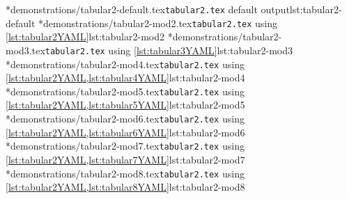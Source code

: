 	\begin{widepage}
		\cmhlistingsfromfile[showspaces=false,showtabs=false]*{demonstrations/tabular2-default.tex}{\texttt{tabular2.tex} default output}{lst:tabular2-default}
		\cmhlistingsfromfile[showspaces=false,showtabs=false]*{demonstrations/tabular2-mod2.tex}{\texttt{tabular2.tex} using \cref{lst:tabular2YAML}}{lst:tabular2-mod2}
		\cmhlistingsfromfile[showspaces=false,showtabs=false]*{demonstrations/tabular2-mod3.tex}{\texttt{tabular2.tex} using \cref{lst:tabular3YAML}}{lst:tabular2-mod3}
		\cmhlistingsfromfile*[showspaces=false,showtabs=false]*{demonstrations/tabular2-mod4.tex}{\texttt{tabular2.tex} using \cref{lst:tabular2YAML,lst:tabular4YAML}}{lst:tabular2-mod4}
		\cmhlistingsfromfile*[showspaces=false,showtabs=false]*{demonstrations/tabular2-mod5.tex}{\texttt{tabular2.tex} using \cref{lst:tabular2YAML,lst:tabular5YAML}}{lst:tabular2-mod5}
		\cmhlistingsfromfile*[showspaces=false,showtabs=false]*{demonstrations/tabular2-mod6.tex}{\texttt{tabular2.tex} using \cref{lst:tabular2YAML,lst:tabular6YAML}}{lst:tabular2-mod6}
		\cmhlistingsfromfile*[showspaces=false,showtabs=false]*{demonstrations/tabular2-mod7.tex}{\texttt{tabular2.tex} using \cref{lst:tabular2YAML,lst:tabular7YAML}}{lst:tabular2-mod7}
		\cmhlistingsfromfile*[showspaces=false,showtabs=false]*{demonstrations/tabular2-mod8.tex}{\texttt{tabular2.tex} using \cref{lst:tabular2YAML,lst:tabular8YAML}}{lst:tabular2-mod8}
	\end{widepage}

